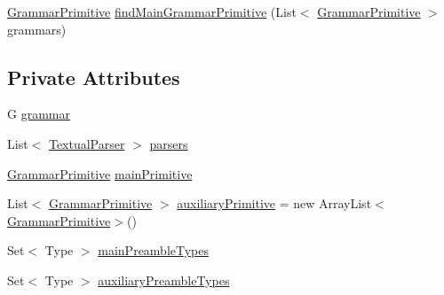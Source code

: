 \begin{DoxyCompactItemize}
\item 
\hyperlink{classit_1_1emarolab_1_1cagg_1_1core_1_1language_1_1syntax_1_1GrammarPrimitive}{Grammar\-Primitive} \hyperlink{classit_1_1emarolab_1_1cagg_1_1core_1_1evaluation_1_1semanticGrammar_1_1syntaxCompiler_1_1Gramma1bf252c3f4def91ad707660fdfe73d0a_a20a51aeb3cac24b998b10fafdce72340}{find\-Main\-Grammar\-Primitive} (List$<$ \hyperlink{classit_1_1emarolab_1_1cagg_1_1core_1_1language_1_1syntax_1_1GrammarPrimitive}{Grammar\-Primitive} $>$ grammars)
\end{DoxyCompactItemize}
\subsection*{Private Attributes}
\begin{DoxyCompactItemize}
\item 
G \hyperlink{classit_1_1emarolab_1_1cagg_1_1core_1_1evaluation_1_1semanticGrammar_1_1syntaxCompiler_1_1Gramma1bf252c3f4def91ad707660fdfe73d0a_a7b9e6b7495c40141044101b9fe3b6c61}{grammar}
\item 
List$<$ \hyperlink{classit_1_1emarolab_1_1cagg_1_1core_1_1language_1_1parser_1_1TextualParser}{Textual\-Parser} $>$ \hyperlink{classit_1_1emarolab_1_1cagg_1_1core_1_1evaluation_1_1semanticGrammar_1_1syntaxCompiler_1_1Gramma1bf252c3f4def91ad707660fdfe73d0a_a7590d69339977f1793a7d9444820705f}{parsers}
\item 
\hyperlink{classit_1_1emarolab_1_1cagg_1_1core_1_1language_1_1syntax_1_1GrammarPrimitive}{Grammar\-Primitive} \hyperlink{classit_1_1emarolab_1_1cagg_1_1core_1_1evaluation_1_1semanticGrammar_1_1syntaxCompiler_1_1Gramma1bf252c3f4def91ad707660fdfe73d0a_ad74d82fc2ba36ba83b17ebacb0dd50cd}{main\-Primitive}
\item 
List$<$ \hyperlink{classit_1_1emarolab_1_1cagg_1_1core_1_1language_1_1syntax_1_1GrammarPrimitive}{Grammar\-Primitive} $>$ \hyperlink{classit_1_1emarolab_1_1cagg_1_1core_1_1evaluation_1_1semanticGrammar_1_1syntaxCompiler_1_1Gramma1bf252c3f4def91ad707660fdfe73d0a_a5e8263e681c980260f6793faf39fdf31}{auxiliary\-Primitive} = new Array\-List$<$ \hyperlink{classit_1_1emarolab_1_1cagg_1_1core_1_1language_1_1syntax_1_1GrammarPrimitive}{Grammar\-Primitive}$>$()
\item 
Set$<$ Type $>$ \hyperlink{classit_1_1emarolab_1_1cagg_1_1core_1_1evaluation_1_1semanticGrammar_1_1syntaxCompiler_1_1Gramma1bf252c3f4def91ad707660fdfe73d0a_a88e2ddf73b39f0887fd24af0a04847d2}{main\-Preamble\-Types}
\item 
Set$<$ Type $>$ \hyperlink{classit_1_1emarolab_1_1cagg_1_1core_1_1evaluation_1_1semanticGrammar_1_1syntaxCompiler_1_1Gramma1bf252c3f4def91ad707660fdfe73d0a_a7f7318940cd05510c4f250487bba5142}{auxiliary\-Preamble\-Types}
\end{DoxyCompactItemize}


